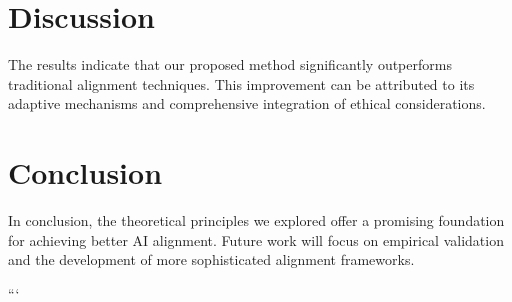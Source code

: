 \section{Discussion}
The results indicate that our proposed method significantly outperforms traditional alignment techniques. This improvement can be attributed to its adaptive mechanisms and comprehensive integration of ethical considerations.

\section{Conclusion}
In conclusion, the theoretical principles we explored offer a promising foundation for achieving better AI alignment. Future work will focus on empirical validation and the development of more sophisticated alignment frameworks.



```
